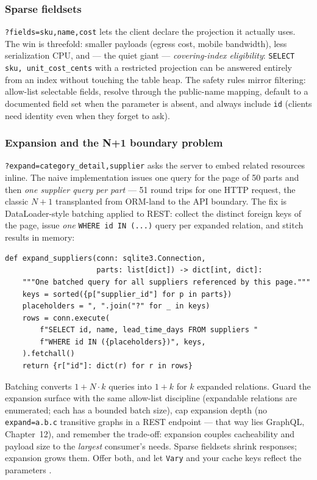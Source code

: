\subsubsection{Sparse fieldsets}

\texttt{?fields=sku,name,cost} lets the client declare the projection it
actually uses. The win is threefold: smaller payloads (egress cost,
mobile bandwidth), less serialization CPU, and --- the quiet giant ---
\emph{covering-index eligibility}: \texttt{SELECT sku, unit\_cost\_cents}
with a restricted projection can be answered entirely from an index without
touching the table heap. The safety rules mirror filtering: allow-list
selectable fields, resolve through the public-name mapping, default to a
documented field set when the parameter is absent, and always include
\texttt{id} (clients need identity even when they forget to ask).

\subsubsection{Expansion and the N+1 boundary problem}

\texttt{?expand=category\_detail,supplier} asks the server to embed related
resources inline. The naive implementation issues one query for the page of
50 parts and then \emph{one supplier query per part} --- 51 round trips for
one HTTP request, the classic $N{+}1$ transplanted from ORM-land to the API
boundary. The fix is DataLoader-style batching applied to REST: collect the
distinct foreign keys of the page, issue \emph{one} \texttt{WHERE id IN
(...)} query per expanded relation, and stitch results in memory:

\begin{verbatim}
def expand_suppliers(conn: sqlite3.Connection,
                     parts: list[dict]) -> dict[int, dict]:
    """One batched query for all suppliers referenced by this page."""
    keys = sorted({p["supplier_id"] for p in parts})
    placeholders = ", ".join("?" for _ in keys)
    rows = conn.execute(
        f"SELECT id, name, lead_time_days FROM suppliers "
        f"WHERE id IN ({placeholders})", keys,
    ).fetchall()
    return {r["id"]: dict(r) for r in rows}
\end{verbatim}

Batching converts $1 + N \cdot k$ queries into $1 + k$ for $k$ expanded
relations. Guard the expansion surface with the same allow-list discipline
(expandable relations are enumerated; each has a bounded batch size), cap
expansion depth (no \texttt{expand=a.b.c} transitive graphs in a REST
endpoint --- that way lies GraphQL, Chapter~12), and remember the trade-off:
expansion couples cacheability and payload size to the \emph{largest}
consumer's needs. Sparse fieldsets shrink responses; expansion grows them.
Offer both, and let \texttt{Vary} and your cache keys reflect the parameters
\cite{rfc9110}.

